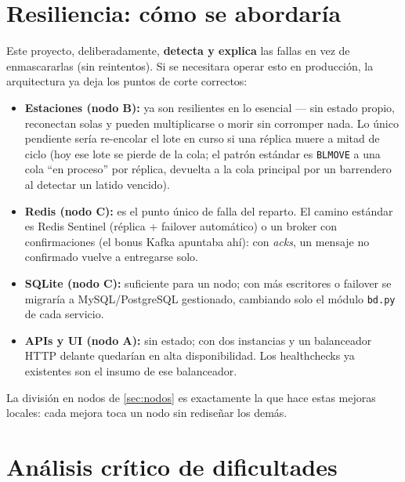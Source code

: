 \documentclass[12pt,a4paper]{article}
\begin{document}
\section{Resiliencia: cómo se abordaría}
\label{sec:resiliencia}

Este proyecto, deliberadamente,
\textbf{detecta y explica} las fallas en vez de enmascararlas (sin reintentos). Si se necesitara operar esto en producción, la
arquitectura ya deja los puntos de corte correctos:

\begin{itemize}[leftmargin=*]
  \item \textbf{Estaciones (nodo B):} ya son resilientes en lo esencial — sin
        estado propio, reconectan solas y
        pueden multiplicarse o morir sin corromper nada. Lo único pendiente
        sería re-encolar el lote en curso si una réplica muere a mitad de
        ciclo (hoy ese lote se pierde de la cola; el patrón estándar es
        \texttt{BLMOVE} a una cola ``en proceso'' por réplica, devuelta a la
        cola principal por un barrendero al detectar un latido vencido).
  \item \textbf{Redis (nodo C):} es el punto único de falla del reparto. El
        camino estándar es Redis Sentinel (réplica + failover automático) o un
        broker con confirmaciones (el bonus Kafka apuntaba ahí): con
        \emph{acks}, un mensaje no confirmado vuelve a entregarse solo.
  \item \textbf{SQLite (nodo C):} suficiente para un nodo; con más escritores
        o failover se migraría a MySQL/PostgreSQL gestionado, cambiando solo
        el módulo \texttt{bd.py} de cada servicio.
  \item \textbf{APIs y UI (nodo A):} sin estado; con dos instancias y un
        balanceador HTTP delante quedarían en alta disponibilidad. Los
        healthchecks ya existentes son el insumo de ese balanceador.
\end{itemize}

La división en nodos de \ref{sec:nodos} es exactamente la que hace estas mejoras locales: cada mejora toca un nodo sin rediseñar los demás.

\section{Análisis crítico de dificultades}
\label{sec:dificultades}
\end{document}
